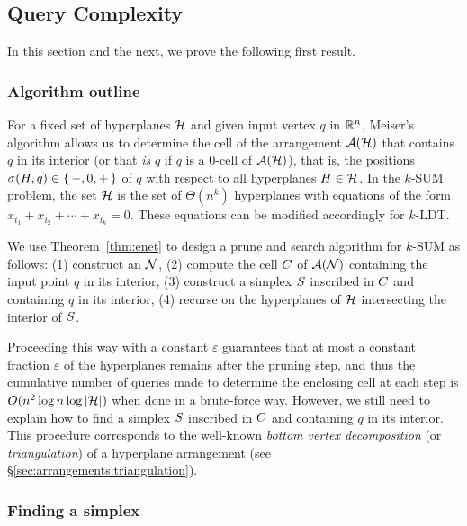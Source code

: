 \subsection{Query Complexity}%
\label{paper:ksum-algorithm:contrib:query-complexity}

In this section and the next, we prove the following first result.
\TheoremKSUMCube*

\subsubsection{Algorithm outline}
For a fixed set of hyperplanes \(\mathcal{H}\) and given input vertex \(q\) in \(\mathbb{R}^n\),
Meiser's algorithm allows us to determine the cell of the arrangement
$\mathcal{A}(\mathcal{H})$ that contains $q$ in its interior (or that \emph{is} $q$ if
$q$ is a $0$-cell of $\mathcal{A}(\mathcal{H})$), that is, the positions $\sigma(H,q) \in
\left\{\,{-, 0, +}\,\right\}$ of \(q\) with respect to all hyperplanes $H \in \mathcal{H}$. In the \(k\)-SUM
problem, the set $\mathcal{H}$ is the set of $\Theta(n^k)$ hyperplanes with equations of the
form $x_{i_1} + x_{i_2} + \cdots + x_{i_k} = 0$.
These equations can be modified accordingly for \(k\)-LDT.

We use Theorem~\ref{thm:enet} to design a prune and search algorithm for
\(k\)-SUM as follows:
(1) construct an \enet{} \(\mathcal{N}\),
(2) compute the cell \(C\) of \(\mathcal{A}(\mathcal{N})\) containing the input
point $q$ in its interior,
(3) construct a simplex \(S\) inscribed in \(C\) and containing
\(q\) in its interior,
(4) recurse on the hyperplanes of \(\mathcal{H}\) intersecting the interior of
\(S\).

Proceeding this way with a constant $\varepsilon$ guarantees that at most a
constant fraction \(\varepsilon\) of the hyperplanes remains after the pruning step,
and thus the cumulative number of queries made to determine the enclosing cell at
each step is $O(n^2 \log n \log |{\mathcal{H}}|)$ when done in a brute-force way.
However, we still need to explain how to find a simplex \(S\) inscribed
in \(C\) and containing \(q\) in its interior.
%
This procedure corresponds to the well-known
\emph{bottom vertex decomposition} (or \emph{triangulation}) of a hyperplane
arrangement (see \S\ref{sec:arrangements:triangulation}).

\subsubsection{Finding a simplex}

